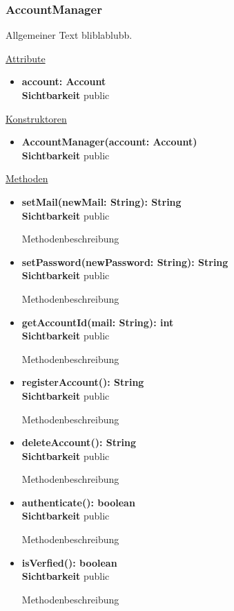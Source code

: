 \subsubsection{AccountManager}
Allgemeiner Text bliblablubb. \newline

\underline{Attribute}
\begin{itemize}
\itemsep0pt
\item \textbf{account: Account} \hfill\\ 
\textbf{Sichtbarkeit} public
\end{itemize}

\underline{Konstruktoren}
\begin{itemize}
\itemsep0pt
\item \textbf{AccountManager(account: Account)} \hfill\\
\textbf{Sichtbarkeit} public
\end{itemize}

\underline{Methoden}
\begin{itemize}
\itemsep0pt
\item \textbf{setMail(newMail: String): String}\hfill\\
\textbf{Sichtbarkeit} public

Methodenbeschreibung

\item \textbf{setPassword(newPassword: String): String}\hfill\\
\textbf{Sichtbarkeit} public

Methodenbeschreibung

\item \textbf{getAccountId(mail: String): int}\hfill\\
\textbf{Sichtbarkeit} public

Methodenbeschreibung
\item \textbf{registerAccount(): String}\hfill\\
\textbf{Sichtbarkeit} public

Methodenbeschreibung
\item \textbf{deleteAccount(): String}\hfill\\
\textbf{Sichtbarkeit} public

Methodenbeschreibung
\item \textbf{authenticate(): boolean}\hfill\\
\textbf{Sichtbarkeit} public

Methodenbeschreibung
\item \textbf{isVerfied(): boolean}\hfill\\
\textbf{Sichtbarkeit} public

Methodenbeschreibung
\end{itemize}